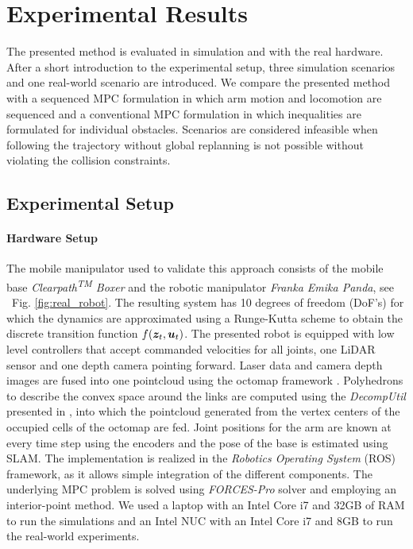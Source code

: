 \section{Experimental Results}
\label{experimental_results}

The presented method is evaluated in simulation and with the real hardware. After a short introduction to the experimental setup, three simulation scenarios and one real-world scenario are introduced. We compare the presented method with a sequenced MPC formulation in which arm motion and locomotion are sequenced and a conventional MPC formulation in which inequalities are formulated for individual obstacles. Scenarios are considered infeasible when following the trajectory without global replanning is not possible without violating the collision constraints.
%
\subsection{Experimental Setup}%
\label{sub:experimental_setup}

\paragraph{Hardware Setup}
The mobile manipulator used to validate this approach consists of the mobile base \textit{Clearpath\textsuperscript{TM} Boxer} and the robotic manipulator \textit{Franka Emika Panda}, see ~{Fig. \ref{fig:real_robot}}. The
resulting system has 10 degrees of freedom (DoF's) for which the dynamics are approximated using a Runge-Kutta scheme to obtain the discrete transition function $f(\bm{z}_t, \bm{u}_t)$.
The presented robot is equipped with low level controllers that accept commanded velocities
for all joints, one LiDAR sensor  and one
depth camera pointing forward. Laser data and camera depth images are fused into one
pointcloud using the octomap framework \cite{Hornung2013}. Polyhedrons to describe the
convex space around the links are computed using the \textit{DecompUtil} presented in
\cite{Liu2017}, into which the pointcloud generated from the vertex centers of the
occupied cells of the octomap are fed.
Joint positions for the arm are known at every time step using the encoders and the pose
of the base is estimated using SLAM.
The implementation is realized in the \textit{Robotics Operating System} (ROS) framework, as it
allows simple integration of the different components. The underlying MPC
problem is solved using \textit{FORCES-Pro} solver \cite{forcespro} and employing an interior-point method\cite{FORCESNLP}. We used a laptop with an Intel Core i7 and 32GB of RAM to run the simulations and an Intel NUC with an Intel Core i7 and 8GB to run the real-world experiments.

